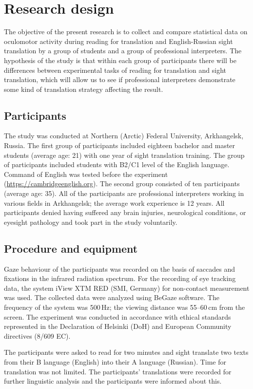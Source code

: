 \documentclass[output=paper]{langscibook}
\begin{document}
\section{Research design}
The objective of the present research is to collect and compare statistical data on oculomotor activity during reading for translation and English-Russian sight translation by a group of students and a group of professional interpreters.
The hypothesis of the study is that within each group of participants there will be differences between experimental tasks of reading for translation and sight translation, which will allow us to see if professional interpreters demonstrate some kind of translation strategy affecting the result.

\subsection{Participants}
The study was conducted at Northern (Arctic) Federal University, Arkhangelsk, Russia. The first group of participants included eighteen bachelor and master students (average age: 21) with one year of sight translation training. The group of participants included students with B2\slash C1 level of the English language. Command of English was tested before the experiment (\url{https://cambridgeenglish.org}).
The second group consisted of ten participants (average age: 35). All of the participants are professional interpreters working in various fields in Arkhangelsk; the average work experience is 12 years. All participants denied having suffered any brain injuries, neurological conditions, or eyesight pathology and took part in the study voluntarily.

\subsection{Procedure and equipment}
Gaze behaviour of the participants was recorded on the basis of saccades and fixations in the infrared radiation spectrum. For the recording of eye tracking data, the system iView XTM RED (SMI, Germany) for non-contact measurement was used. The collected data were analyzed using BeGaze software. The frequency of the system was 500\,Hz; the viewing distance was 55--60\,cm from the screen. The experiment was conducted in accordance with ethical standards represented in the Declaration of Helsinki (DoH) and European Community directives (8/609 EC).

The participants were asked to read for two minutes and sight translate two texts from their B language (English) into their A language (Russian). Time for translation was not limited. The participants’ translations were recorded for further linguistic analysis and the participants were informed about this.
\end{document}
